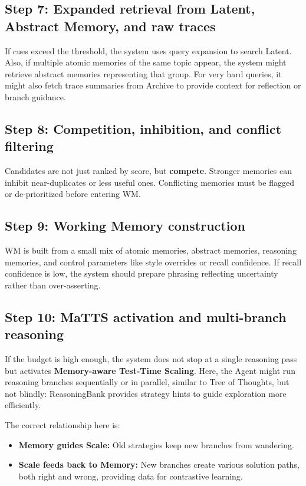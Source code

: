 \documentclass[a4paper,12pt]{article}
\begin{document}
\subsection*{Step 7: Expanded retrieval from Latent, Abstract Memory, and raw traces}

If cues exceed the threshold, the system uses query expansion to search Latent. Also, if multiple atomic memories of the same topic appear, the system might retrieve abstract memories representing that group. For very hard queries, it might also fetch trace summaries from Archive to provide context for reflection or branch guidance.

\subsection*{Step 8: Competition, inhibition, and conflict filtering}

Candidates are not just ranked by score, but \textbf{compete}. Stronger memories can inhibit near-duplicates or less useful ones. Conflicting memories must be flagged or de-prioritized before entering WM.

\subsection*{Step 9: Working Memory construction}

WM is built from a small mix of atomic memories, abstract memories, reasoning memories, and control parameters like style overrides or recall confidence. If recall confidence is low, the system should prepare phrasing reflecting uncertainty rather than over-asserting.

\subsection*{Step 10: MaTTS activation and multi-branch reasoning}

If the budget is high enough, the system does not stop at a single reasoning pass but activates \textbf{Memory-aware Test-Time Scaling}. Here, the Agent might run reasoning branches sequentially or in parallel, similar to Tree of Thoughts, but not blindly: ReasoningBank provides strategy hints to guide exploration more efficiently.

The correct relationship here is:
\begin{itemize}
    \item \textbf{Memory guides Scale:} Old strategies keep new branches from wandering.
    \item \textbf{Scale feeds back to Memory:} New branches create various solution paths, both right and wrong, providing data for contrastive learning.
\end{itemize}
\end{document}
